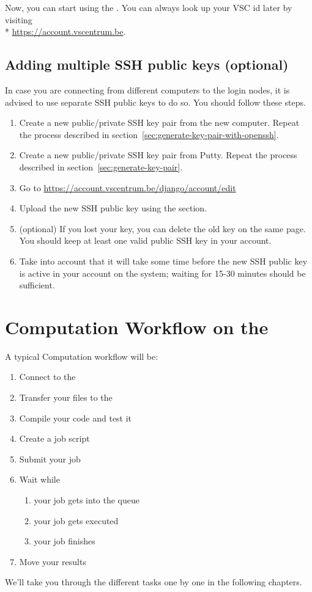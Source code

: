 Now, you can start using the \hpc. You can always look up your VSC id later by visiting\\*
\url{https://account.vscentrum.be}.

\subsection{Adding multiple SSH public keys (optional)}
\label{sec:adding-multiple-keys}
In case you are connecting from different computers to the login nodes, it is advised to use separate SSH public keys to do so.
You should follow these steps.

\begin{enumerate}
\ifmacORlinux
 \item Create a new public/private SSH key pair from the new computer. Repeat the process described in section~\ref{sec:generate-key-pair-with-openssh}.
\fi %
\ifwindows
 \item Create a new public/private SSH key pair from Putty. Repeat the process described in section~\ref{sec:generate-key-pair}.
\fi %
 \item Go to \url{https://account.vscentrum.be/django/account/edit}
 \item Upload the new SSH public key using the  section.
 \item (optional) If you lost your key, you can delete the old key on the same page. You should keep at least one valid public SSH key in your account.
 \item Take into account that it will take some time before the new SSH public key is active in your account on the system; waiting for 15-30 minutes should be sufficient.
\end{enumerate}

\section{Computation Workflow on the \hpc}
\label{sec:compuation-workflow-on-the-hpc}

A typical Computation workflow will be:

\begin{enumerate}
  \item  Connect to the \hpc
  \item  Transfer your files to the \hpc
  \item  Compile your code and test it
  \item  Create a job script
  \item  Submit your job
  \item  Wait while
  \begin{enumerate}
    \item  your job gets into the queue
    \item  your job gets executed
    \item  your job finishes
  \end{enumerate}
  \item  Move your results
\end{enumerate}

We'll take you through the different tasks one by one in the following
chapters.
